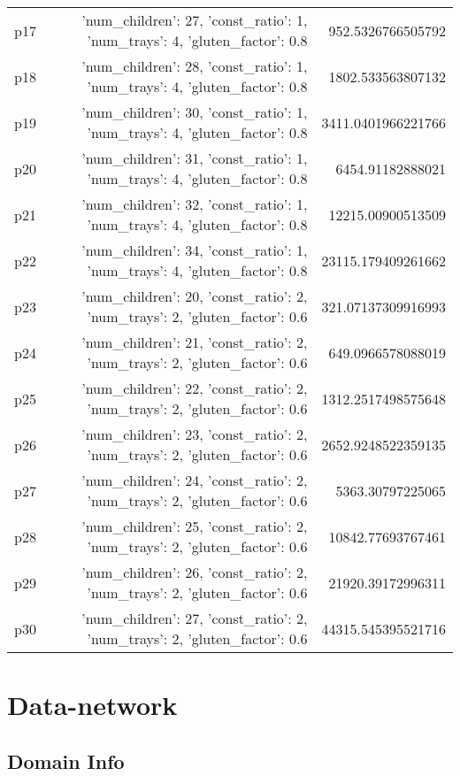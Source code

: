 \documentclass{article}
\begin{document}
\begin{center}
\begin{tabular}{r|r|r}
  p17&{'num\_children': 27, 'const\_ratio': 1, 'num\_trays': 4, 'gluten\_factor': 0.8}&952.5326766505792\\
  p18&{'num\_children': 28, 'const\_ratio': 1, 'num\_trays': 4, 'gluten\_factor': 0.8}&1802.533563807132\\
  p19&{'num\_children': 30, 'const\_ratio': 1, 'num\_trays': 4, 'gluten\_factor': 0.8}&3411.0401966221766\\
  p20&{'num\_children': 31, 'const\_ratio': 1, 'num\_trays': 4, 'gluten\_factor': 0.8}&6454.91182888021\\
  p21&{'num\_children': 32, 'const\_ratio': 1, 'num\_trays': 4, 'gluten\_factor': 0.8}&12215.00900513509\\
  p22&{'num\_children': 34, 'const\_ratio': 1, 'num\_trays': 4, 'gluten\_factor': 0.8}&23115.179409261662\\
  p23&{'num\_children': 20, 'const\_ratio': 2, 'num\_trays': 2, 'gluten\_factor': 0.6}&321.07137309916993\\
  p24&{'num\_children': 21, 'const\_ratio': 2, 'num\_trays': 2, 'gluten\_factor': 0.6}&649.0966578088019\\
  p25&{'num\_children': 22, 'const\_ratio': 2, 'num\_trays': 2, 'gluten\_factor': 0.6}&1312.2517498575648\\
  p26&{'num\_children': 23, 'const\_ratio': 2, 'num\_trays': 2, 'gluten\_factor': 0.6}&2652.9248522359135\\
  p27&{'num\_children': 24, 'const\_ratio': 2, 'num\_trays': 2, 'gluten\_factor': 0.6}&5363.30797225065\\
  p28&{'num\_children': 25, 'const\_ratio': 2, 'num\_trays': 2, 'gluten\_factor': 0.6}&10842.77693767461\\
  p29&{'num\_children': 26, 'const\_ratio': 2, 'num\_trays': 2, 'gluten\_factor': 0.6}&21920.39172996311\\
  p30&{'num\_children': 27, 'const\_ratio': 2, 'num\_trays': 2, 'gluten\_factor': 0.6}&44315.545395521716
                            \end{tabular}
                            \end{center}
                    
                            \newpage \section{Data-network}
                    \subsection*{Domain Info}
\end{document}
